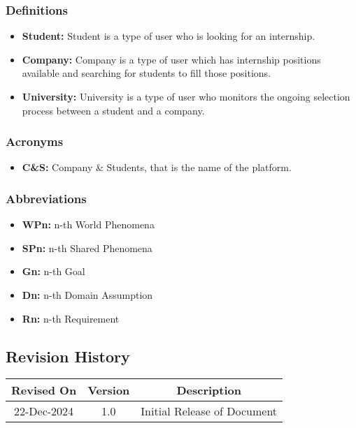 \subsubsection{Definitions}
\begin{itemize}
    \item \textbf{Student: } Student is a type of user who is looking for an internship.
    \item \textbf{Company: } Company is a type of user which has internship positions available and searching for students to fill those positions.
    \item \textbf{University: } University is a type of user who monitors the ongoing selection process between a student and a company.
\end{itemize}
\subsubsection{Acronyms}
\begin{itemize}
    \item \textbf{C\&S:} Company \& Students, that is the name of the platform.

\end{itemize}
\subsubsection{Abbreviations}
\begin{itemize}
\item \textbf{WPn:} n-th World Phenomena
\item \textbf{SPn:} n-th Shared Phenomena
\item \textbf{Gn: } n-th Goal
\item \textbf{Dn: } n-th Domain Assumption
\item \textbf{Rn: } n-th Requirement
\end{itemize}

\subsection{Revision History}
\begin{center}
\begin{tabular}{ | c | c | c | }
 \hline
 Revised On & Version & Description \\
 \hline
 22-Dec-2024 & 1.0 & Initial Release of Document \\
 \hline
\end{tabular}
\end{center}

